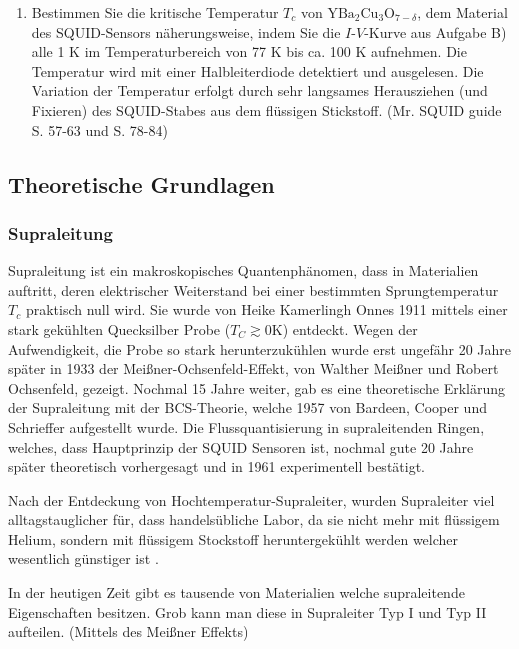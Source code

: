\documentclass{article}
\begin{document}
\begin{enumerate}
    \item Bestimmen Sie die kritische Temperatur $T_c$ von $\text{YBa}_2\text{Cu}_3\text{O}_{7-\delta}$, dem Material des SQUID-Sensors näherungsweise, indem Sie die $I$-$V$-Kurve aus Aufgabe B) alle 1 K im Temperaturbereich von 77 K bis ca. 100 K aufnehmen. Die Temperatur wird mit einer Halbleiterdiode detektiert und ausgelesen. Die Variation der Temperatur erfolgt durch sehr langsames Herausziehen (und Fixieren) des SQUID-Stabes aus dem flüssigen Stickstoff. (Mr. SQUID guide S. 57-63 und S. 78-84) \cite{mr_squid}
\end{enumerate}







\subsection{Theoretische Grundlagen}

\subsubsection{Supraleitung}

Supraleitung ist ein makroskopisches Quantenphänomen, dass in Materialien auftritt, deren elektrischer Weiterstand bei einer bestimmten Sprungtemperatur $T_c$ praktisch null wird. Sie wurde von Heike Kamerlingh Onnes 1911 mittels einer stark gekühlten Quecksilber Probe ($T_C \gtrsim 0\mathrm{K}$) entdeckt. Wegen der Aufwendigkeit, die Probe so stark herunterzukühlen wurde erst ungefähr 20 Jahre später in 1933 der Meißner-Ochsenfeld-Effekt, von Walther Meißner und Robert Ochsenfeld, gezeigt. Nochmal 15 Jahre weiter, gab es eine theoretische Erklärung der Supraleitung mit der BCS-Theorie, welche 1957 von Bardeen, Cooper und Schrieffer aufgestellt wurde. Die Flussquantisierung in supraleitenden Ringen, welches, dass Hauptprinzip der SQUID Sensoren ist, nochmal gute 20 Jahre später theoretisch vorhergesagt und in 1961 experimentell bestätigt. \cite{mr_squid} \cite{fprak_manual}

Nach der Entdeckung von Hochtemperatur-Supraleiter, wurden Supraleiter viel alltagstauglicher für, dass handelsübliche Labor, da sie nicht mehr mit flüssigem Helium, sondern mit flüssigem Stockstoff heruntergekühlt werden welcher wesentlich günstiger ist \cite{liquid_he_na_prices}.

In der heutigen Zeit gibt es tausende von Materialien welche supraleitende Eigenschaften besitzen. Grob kann man diese in Supraleiter Typ I und Typ II aufteilen. (Mittels des Meißner Effekts)
\end{document}
